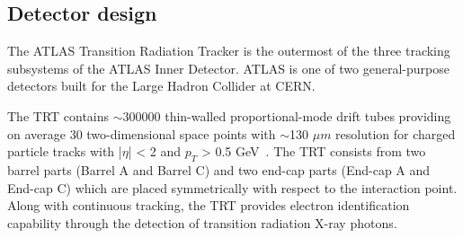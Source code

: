 \subsection{Detector design}
\label{subsec:trt_description}
The ATLAS Transition Radiation Tracker is the outermost of the three tracking subsystems of the ATLAS Inner Detector. 
ATLAS is one of two general-purpose detectors built for the Large Hadron Collider at CERN.

The TRT contains $\sim$300000 thin-walled proportional-mode drift tubes providing on average 30 two-dimensional 
space points with $\sim$130 $\mu m$ resolution for charged particle tracks with |$\eta$| < 2 and $p_T$ > 0.5 GeV~\cite{Abat:2008zza,Abat:2008zzb,Abat:2008zz}.
The TRT consists from two barrel parts (Barrel A and Barrel C) and two end-cap parts (End-cap A and End-cap C) 
which are placed symmetrically with respect to the interaction point.
Along with continuous tracking, the TRT provides electron identification capability through the detection of transition radiation X-ray photons.





